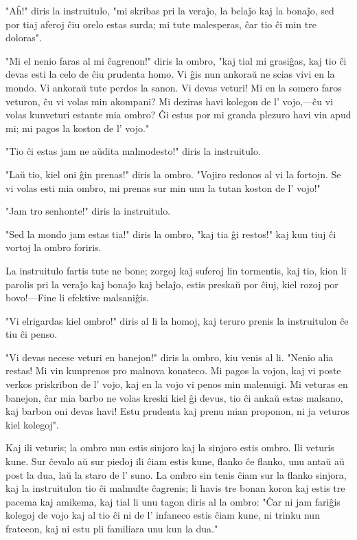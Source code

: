 "Aĥ!" diris la instruitulo, "mi skribas pri la veraĵo, la belaĵo kaj la bonaĵo, sed por tiaj aferoj ĉiu orelo estas surda; mi tute malesperas, ĉar tio ĉi min tre doloras".

"Mi el nenio faras al mi ĉagrenon!" diris la ombro, "kaj tial mi grasiĝas, kaj tio ĉi devas esti la celo de ĉiu prudenta homo. Vi ĝis nun ankoraŭ ne scias vivi en la mondo. Vi ankoraŭ tute perdos la sanon. Vi devas veturi! Mi en la somero faros veturon, ĉu vi volas min akompani? Mi deziras havi kolegon de l' vojo,---ĉu vi volas kunveturi estante mia ombro? Ĝi estus por mi granda plezuro havi vin apud mi; mi pagos la koston de l' vojo."

"Tio ĉi estas jam ne aŭdita malmodesto!" diris la instruitulo.

"Laŭ tio, kiel oni ĝin prenas!" diris la ombro. "Vojiro redonos al vi la fortojn. Se vi volas esti mia ombro, mi prenas sur min unu la tutan koston de l' vojo!"

"Jam tro senhonte!" diris la instruitulo.

"Sed la mondo jam estas tia!" diris la ombro, "kaj tia ĝi restos!" kaj kun tiuj ĉi vortoj la ombro foriris.

La instruitulo fartis tute ne bone; zorgoj kaj suferoj lin tormentis, kaj tio, kion li parolis pri la veraĵo kaj bonaĵo kaj belaĵo, estis preskaŭ por ĉiuj, kiel rozoj por bovo!---Fine li efektive malsaniĝis.

"Vi elrigardas kiel ombro!" diris al li la homoj, kaj teruro prenis la instruitulon ĉe tiu ĉi penso.

"Vi devas necese veturi en banejon!" diris la ombro, kiu venis al li. "Nenio alia restas! Mi vin kunprenos pro malnova konateco. Mi pagos la vojon, kaj vi poste verkos priskribon de l' vojo, kaj en la vojo vi penos min malenuigi. Mi veturas en banejon, ĉar mia barbo ne volas kreski kiel ĝi devus, tio ĉi ankaŭ estas malsano, kaj barbon oni devas havi! Estu prudenta kaj prenu mian proponon, ni ja veturos kiel kolegoj".

Kaj ili veturis; la ombro nun estis sinjoro kaj la sinjoro estis ombro. Ili veturis kune. Sur ĉevalo aŭ sur piedoj ili ĉiam estis kune, flanko ĉe flanko, unu antaŭ aŭ post la dua, laŭ la staro de l' suno. La ombro sin tenis ĉiam sur la flanko sinjora, kaj la instruitulon tio ĉi malmulte ĉagrenis; li havis tre bonan koron kaj estis tre pacema kaj amikema, kaj tial li unu tagon diris al la ombro: "Ĉar ni jam fariĝis kolegoj de vojo kaj al tio ĉi ni de l' infaneco estis ĉiam kune, ni trinku nun fratecon, kaj ni estu pli familiara unu kun la dua."

